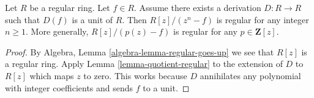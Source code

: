 \begin{lemma}
\label{lemma-degree-p-extension-regular}
Let $R$ be a regular ring. Let $f \in R$.
Assume there exists a derivation $D : R \to R$ such that $D(f)$ is a unit
of $R$. Then $R[z]/(z^n - f)$ is regular for any integer $n \geq 1$.
More generally, $R[z]/(p(z) - f)$ is regular for any $p \in \mathbf{Z}[z]$.
\end{lemma}

\begin{proof}
By Algebra, Lemma \ref{algebra-lemma-regular-goes-up} we see that
$R[z]$ is a regular ring. Apply Lemma \ref{lemma-quotient-regular}
to the extension of $D$ to $R[z]$ which maps $z$ to zero.
This works because $D$ annihilates any polynomial with
integer coefficients and sends $f$ to a unit.
\end{proof}
